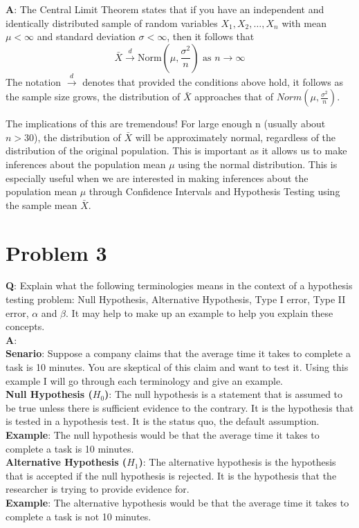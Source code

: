 \documentclass{article}
\begin{document}
\textbf{A}: The Central Limit Theorem states that if you have an independent and identically distributed sample of random variables $X_1, X_2, \ldots, X_n$ with mean $\mu < \infty$ and standard deviation $\sigma < \infty$, then it follows that $$\bar{X} \xrightarrow{d} \text{Norm}(\mu, \frac{\sigma^2}{n}) \text{ as } n \rightarrow \infty$$
The notation $\xrightarrow{d}$ denotes that provided the conditions above hold, it follows as the sample size grows, the distribution of $\bar{X}$ approaches that of $Norm(\mu, \frac{\sigma^2}{n})$.

The implications of this are tremendous! For large enough n (usually about $n>30$), the distribution of $\bar{X}$ will be approximately normal, regardless of the distribution of the original population. This is important as it allows us to make inferences about the population mean $\mu$ using the normal distribution. This is especially useful when we are interested in making inferences about the population mean $\mu$ through Confidence Intervals and Hypothesis Testing using the sample mean $\bar{X}$. 
 
\section*{Problem 3}
\textbf{Q}: Explain what the following terminologies means in the context of a hypothesis testing problem: Null Hypothesis, Alternative Hypothesis, Type I error, Type II error, $\alpha$ and $\beta$. It may help to make up an example to help you explain these concepts.\\

\textbf{A}:\\
\textbf{Senario}: Suppose a company claims that the average time it takes to complete a task is 10 minutes. You are skeptical of this claim and want to test it. Using this example I will go through each terminology and give an example.\\

\textbf{Null Hypothesis ($H_0$)}: The null hypothesis is a statement that is assumed to be true unless there is sufficient evidence to the contrary. It is the hypothesis that is tested in a hypothesis test. It is the status quo, the default assumption.\\
\textbf{Example}: The null hypothesis would be that the average time it takes to complete a task is 10 minutes.\\

\textbf{Alternative Hypothesis ($H_1$)}: The alternative hypothesis is the hypothesis that is accepted if the null hypothesis is rejected. It is the hypothesis that the researcher is trying to provide evidence for.\\
\textbf{Example}: The alternative hypothesis would be that the average time it takes to complete a task is not 10 minutes.\\
\end{document}
